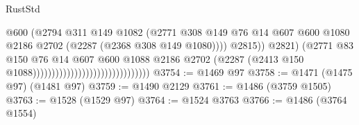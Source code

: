 \begin{lexlean}{RustStd}
\begin{coremodule}
                                                                  @600
                                                                  (@2794
                                                                    @311
                                                                    @149
                                                                    @1082
                                                                    (@2771
                                                                      @308
                                                                      @149
                                                                      @76
                                                                      @14
                                                                      @607
                                                                      @600
                                                                      @1080
                                                                      @2186
                                                                      @2702
                                                                      (@2287
                                                                        (@2368 @308 @149 @1080))))
                                                                  @2815))
                                                              @2821)
                                                            (@2771
                                                              @83
                                                              @150
                                                              @76
                                                              @14
                                                              @607
                                                              @600
                                                              @1088
                                                              @2186
                                                              @2702
                                                              (@2287
                                                                (@2413
                                                                  @150
                                                                  @1088)))))))))))))))))))))))))))))))
@3754 := @1469 @97
@3758 := @1471 (@1475 @97) (@1481 @97)
@3759 := @1490 @2129
@3761 := @1486 (@3759 @1505)
@3763 := @1528 (@1529 @97)
@3764 := @1524 @3763
@3766 := @1486 (@3764 @1554)

\end{coremodule}
\end{lexlean}
